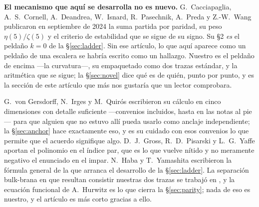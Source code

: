 \documentclass[11pt,a4paper]{article}
\begin{document}
\textbf{El mecanismo que aquí se desarrolla no es nuevo.} G.~Cacciapaglia, A.~S.~Cornell,
A.~Deandrea, W.~Isnard, R.~Pasechnik, A.~Preda y Z.-W.~Wang \cite{CCD24} publicaron en septiembre de
2024 la suma partida por paridad, su peso $\eta(5)/\zeta(5)$ y el criterio de estabilidad que se
sigue de su signo. Su \S2 \emph{es} el peldaño $k=0$ de la \S\ref{sec:ladder}. Sin ese artículo, lo
que aquí aparece como un peldaño de una escalera se habría escrito como un hallazgo. Nuestro es el
peldaño de encima ---la curvatura---, su empaquetado como dos trazas estándar, y la aritmética que
se sigue; la \S\ref{sec:novel} dice qué es de quién, punto por punto, y es la sección de este
artículo que más nos gustaría que un lector comprobara.

G.~von Gersdorff, N.~Irges y M.~Quir\'os \cite{vGIQ} escribieron su cálculo en cinco dimensiones con
detalle suficiente ---convenios incluidos, hasta en las notas al pie--- para que alguien que no
estuvo allí pueda usarlo como anclaje independiente; la \S\ref{sec:anchor} hace exactamente eso, y
es su cuidado con esos convenios lo que permite que el acuerdo signifique algo. D.~J.~Gross,
R.~D.~Pisarski y L.~G.~Yaffe \cite{GPY} aportan el polinomio en el índice par, que es lo que vuelve
nítido y no meramente negativo el enunciado en el impar. N.~Haba y T.~Yamashita \cite{HY04}
escribieron la fórmula general de la que arranca el desarrollo de la \S\ref{sec:ladder}. La
separación bulk-brana en que resultan consistir nuestras dos trazas se trabajó en
\cite{vGQ03,SS04,GNH05,GLS06}, y la ecuación funcional de A.~Hurwitz \cite{Hurwitz1882,Apostol} es
lo que cierra la \S\ref{sec:parity}; nada de eso es nuestro, y el artículo es más corto gracias a
ello.

\end{document}
